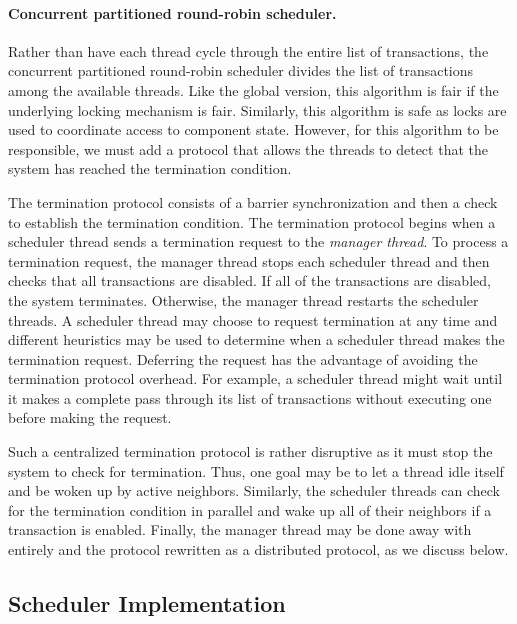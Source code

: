 \paragraph{Concurrent partitioned round-robin scheduler.}
Rather than have each thread cycle through the entire list of transactions, the concurrent partitioned round-robin scheduler divides the list of transactions among the available threads.
Like the global version, this algorithm is fair if the underlying locking mechanism is fair.
Similarly, this algorithm is safe as locks are used to coordinate access to component state.
However, for this algorithm to be responsible, we must add a protocol that allows the threads to detect that the system has reached the termination condition.

The termination protocol consists of a barrier synchronization and then a check to establish the termination condition.
The termination protocol begins when a scheduler thread sends a termination request to the \emph{manager thread}.
To process a termination request, the manager thread stops each scheduler thread and then checks that all transactions are disabled.
If all of the transactions are disabled, the system terminates.
Otherwise, the manager thread restarts the scheduler threads.
A scheduler thread may choose to request termination at any time and different heuristics may be used to determine when a scheduler thread makes the termination request.
Deferring the request has the advantage of avoiding the termination protocol overhead.
For example, a scheduler thread might wait until it makes a complete pass through its list of transactions without executing one before making the request.

Such a centralized termination protocol is rather disruptive as it must stop the system to check for termination.
Thus, one goal may be to let a thread idle itself and be woken up by active neighbors.
Similarly, the scheduler threads can check for the termination condition in parallel and wake up all of their neighbors if a transaction is enabled.
Finally, the manager thread may be done away with entirely and the protocol rewritten as a distributed protocol, as we discuss below.

\subsection{Scheduler Implementation}

